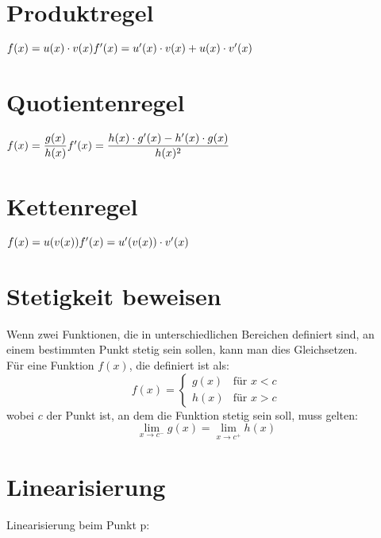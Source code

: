 \documentclass{article}
\begin{document}
\begin{multicols}{2}

\section*{Produktregel}

\(
	f(x) = u(x) \cdot v(x) \\
	f'(x) = u'(x) \cdot v(x) + u(x) \cdot v'(x)
\)

\section*{Quotientenregel}

\(
	f(x) = \dfrac{g(x)}{h(x)} \\
	f'(x) = \dfrac{h(x) \cdot g'(x) - h'(x) \cdot g(x)}{h(x)^2}
\)

\section*{Kettenregel}

\(
	f(x) = u(v(x)) \\
	f'(x) = u'(v(x)) \cdot v'(x)
\)

\section*{Stetigkeit beweisen}

\begin{minipage}{0.4\textwidth}
	Wenn zwei Funktionen, die in unterschiedlichen Bereichen definiert sind, an einem bestimmten Punkt stetig sein sollen, kann man dies Gleichsetzen. \\
	
	Für eine Funktion \( f(x) \), die definiert ist als:
	\[
		f(x) = 
		\begin{cases} 
			g(x) & \text{für } x < c \\
			h(x) & \text{für } x > c 
		\end{cases}
	\]
	wobei \( c \) der Punkt ist, an dem die Funktion stetig sein soll, muss gelten:
	\[
		\lim_{{x \to c^-}} g(x) = \lim_{{x \to c^+}} h(x)
	\]
\end{minipage}

\section*{Linearisierung}

Linearisierung beim Punkt p:


\end{multicols}
\end{document}
